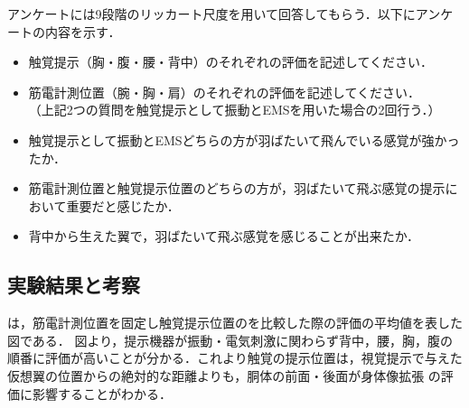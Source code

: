 \begin{small}
        アンケートには9段階のリッカート尺度を用いて回答してもらう．以下にアンケートの内容を示す．
        \begin{itemize}
        \item 触覚提示（胸・腹・腰・背中）のそれぞれの評価を記述してください．
        \item 筋電計測位置（腕・胸・肩）のそれぞれの評価を記述してください．\\
        （上記2つの質問を触覚提示として振動とEMSを用いた場合の2回行う．）
        \item  触覚提示として振動とEMSどちらの方が羽ばたいて飛んでいる感覚が強かったか．
        \item 筋電計測位置と触覚提示位置のどちらの方が，羽ばたいて飛ぶ感覚の提示において重要だと感じたか．
        \item 背中から生えた翼で，羽ばたいて飛ぶ感覚を感じることが出来たか．
        \end{itemize}


  \subsection{実験結果と考察}




        

        は，筋電計測位置を固定し触覚提示位置のを比較した際の評価の平均値を表した図である．
        図より，提示機器が振動・電気刺激に関わらず背中，腰，胸，腹の順番に評価が高いことが分かる．これより触覚の提示位置は，視覚提示で与えた仮想翼の位置からの絶対的な距離よりも，胴体の前面・後面が身体像拡張
        の評価に影響することがわかる．


\end{small}
